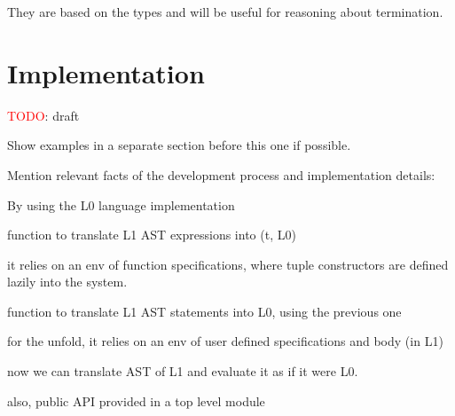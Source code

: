 They are based on the types and will be useful for reasoning about termination.

\section{Implementation}

\textcolor{red}{TODO}: draft

Show examples in a separate section before this one if possible.

Mention relevant facts of the development process and implementation details:

By using the L0 language implementation

function to translate L1 AST expressions into (t, L0)

it relies on an env of function specifications, where tuple constructors are 
defined lazily into the system.

function to translate L1 AST statements into L0, using the previous one 

for the unfold, it relies on an env of user defined specifications and 
body (in L1)

now we can translate AST of L1 and evaluate it as if it were L0.

also, public API provided in a top level module
